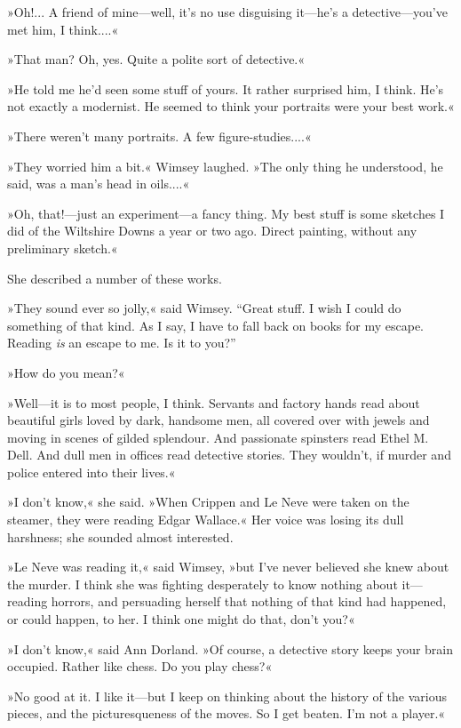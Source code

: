 »Oh!... A friend of mine\allowbreak---\allowbreak well, it's no use disguising it\allowbreak---\allowbreak he's a detective\allowbreak---\allowbreak you've met him, I think....«

»That man? Oh, yes. Quite a polite sort of detective.«

»He told me he'd seen some stuff of yours. It rather surprised him, I think. He's not exactly a modernist. He seemed to think your portraits were your best work.«

»There weren't many portraits. A few figure-studies....«

»They worried him a bit.« Wimsey laughed. »The only thing he understood, he said, was a man's head in oils....«

»Oh, that!---just an experiment\allowbreak---\allowbreak a fancy thing. My best stuff is some sketches I did of the Wiltshire Downs a year or two ago. Direct painting, without any preliminary sketch.«

She described a number of these works.

»They sound ever so jolly,« said Wimsey. \enquote{Great stuff. I wish I could do something of that kind. As I say, I have to fall back on books for my escape. Reading \textit{is} an escape to me. Is it to you?}

»How do you mean?«

»Well\allowbreak---\allowbreak it is to most people, I think. Servants and factory hands read about beautiful girls loved by dark, handsome men, all covered over with jewels and moving in scenes of gilded splendour. And passionate spinsters read Ethel M. Dell. And dull men in offices read detective stories. They wouldn't, if murder and police entered into their lives.«

»I don't know,« she said. »When Crippen and Le Neve were taken on the steamer, they were reading Edgar Wallace.« Her voice was losing its dull harshness; she sounded almost interested.

»Le Neve was reading it,« said Wimsey, »but I've never believed she knew about the murder. I think she was fighting desperately to know nothing about it\allowbreak---\allowbreak reading horrors, and persuading herself that nothing of that kind had happened, or could happen, to her. I think one might do that, don't you?«

»I don't know,« said Ann Dorland. »Of course, a detective story keeps your brain occupied. Rather like chess. Do you play chess?«

»No good at it. I like it\allowbreak---\allowbreak but I keep on thinking about the history of the various pieces, and the picturesqueness of the moves. So I get beaten. I'm not a player.«


